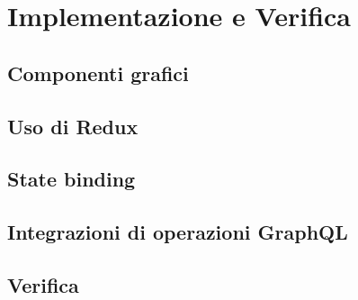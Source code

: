 \chapter{Implementazione e Verifica}

\section{Componenti grafici}

\section{Uso di Redux}

\section{State binding}

\section{Integrazioni di operazioni GraphQL}

\section{Verifica}